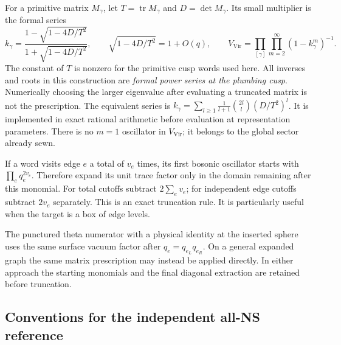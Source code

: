 For a primitive matrix $M_\gamma$, let $T=\operatorname{tr}M_\gamma$
and $D=\det M_\gamma$. Its small multiplier is the formal series
\begin{equation}
 k_\gamma=\frac{1-\sqrt{1-4D/T^2}}{1+\sqrt{1-4D/T^2}},
 \qquad \sqrt{1-4D/T^2}=1+O(q),
 \qquad
 V_{\mathrm{Vir}}=\prod_{[\gamma]}\prod_{m=2}^{\infty}(1-k_\gamma^m)^{-1}.
 \label{eq:app-schottky}
\end{equation}
The constant of $T$ is nonzero for the primitive cusp words used here.
All inverses and roots in this construction are \emph{formal power
series at the plumbing cusp}. Numerically choosing the larger eigenvalue
after evaluating a truncated matrix is not the prescription.
The equivalent series is
$k_\gamma=\sum_{l\ge1}\frac1{l+1}\binom{2l}{l}(D/T^2)^l$.
It is implemented in exact rational arithmetic before evaluation at
representation parameters. There is no $m=1$ oscillator in
$V_{\mathrm{Vir}}$; it belongs to the global sector already sewn.

If a word visits edge $e$ a total of $v_e$ times, its first bosonic
oscillator starts with $\prod_e q_e^{2v_e}$. Therefore expand its
unit trace factor only in the domain remaining after this monomial.
For total cutoffs subtract $2\sum_e v_e$; for independent edge cutoffs
subtract $2v_e$ separately. This is an exact truncation rule. It is
particularly useful when the target is a box of edge levels.

The punctured theta numerator with a physical identity at the inserted
sphere uses the same surface vacuum factor after $q_e=q_{e_L}q_{e_R}$.
On a general expanded graph the same matrix prescription may instead
be applied directly. In either approach the starting monomials and
the final diagonal extraction are retained before truncation.

\subsection{Conventions for the independent all-NS reference}
\label{app:ns-reference}

